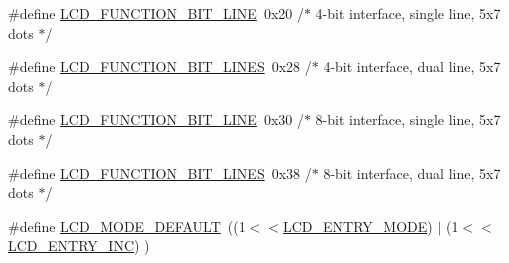 \begin{DoxyCompactItemize}
\item 
\#define \hyperlink{group__pfleury__lcd_gaff4e5baa36a0322eb97557dcb18cd96e}{L\+C\+D\+\_\+\+F\+U\+N\+C\+T\+I\+O\+N\+\_\+B\+I\+T\+\_\+L\+I\+NE}~0x20   /$\ast$ 4-\/bit interface, single line, 5x7 dots $\ast$/
\item 
\#define \hyperlink{group__pfleury__lcd_gab35032ab368a8bc90798e0c547fb24c2}{L\+C\+D\+\_\+\+F\+U\+N\+C\+T\+I\+O\+N\+\_\+B\+I\+T\+\_\+L\+I\+N\+ES}~0x28   /$\ast$ 4-\/bit interface, dual line,   5x7 dots $\ast$/
\item 
\#define \hyperlink{group__pfleury__lcd_gaa8aeee098cb4c84ec420e00d054abcce}{L\+C\+D\+\_\+\+F\+U\+N\+C\+T\+I\+O\+N\+\_\+B\+I\+T\+\_\+L\+I\+NE}~0x30   /$\ast$ 8-\/bit interface, single line, 5x7 dots $\ast$/
\item 
\#define \hyperlink{group__pfleury__lcd_ga160a214f47869f8f98ad5add3a7568db}{L\+C\+D\+\_\+\+F\+U\+N\+C\+T\+I\+O\+N\+\_\+B\+I\+T\+\_\+L\+I\+N\+ES}~0x38   /$\ast$ 8-\/bit interface, dual line,   5x7 dots $\ast$/
\item 
\#define \hyperlink{group__pfleury__lcd_ga1849e2087d3034a3fffa67444beed109}{L\+C\+D\+\_\+\+M\+O\+D\+E\+\_\+\+D\+E\+F\+A\+U\+LT}~((1$<$$<$\hyperlink{group__pfleury__lcd_gae5d757ddb6d94de8c82191b60b40e442}{L\+C\+D\+\_\+\+E\+N\+T\+R\+Y\+\_\+\+M\+O\+DE}) $\vert$ (1$<$$<$\hyperlink{group__pfleury__lcd_gada766266a0be0d0040fbf86e23b58aa6}{L\+C\+D\+\_\+\+E\+N\+T\+R\+Y\+\_\+\+I\+NC}) )
\end{DoxyCompactItemize}
